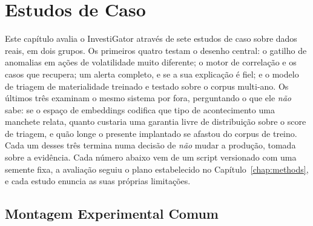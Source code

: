 
\chapter{Estudos de Caso}
\label{chap:casestudies}

Este capítulo avalia o InvestiGator através de sete estudos de caso sobre dados reais, em dois grupos. Os
primeiros quatro testam o desenho central: o gatilho de anomalias em ações de volatilidade muito
diferente; o motor de correlação e os casos que recupera; um alerta completo, e se a sua explicação
é fiel; e o modelo de triagem de materialidade treinado e testado sobre o corpus multi-ano. Os últimos
três examinam o mesmo sistema por fora, perguntando o que ele \emph{não} sabe: se o espaço de embeddings
codifica que tipo de acontecimento uma manchete relata, quanto custaria uma garantia livre de distribuição
sobre o score de triagem, e quão longe o presente implantado se afastou do corpus de treino. Cada um
desses três termina numa decisão de \emph{não} mudar a produção, tomada sobre a evidência. Cada número abaixo vem de um script versionado com uma semente
fixa, a avaliação seguiu o plano estabelecido no Capítulo~\ref{chap:methods}, e cada estudo enuncia as
suas próprias limitações.

\section{Montagem Experimental Comum}
\label{sec:cs_setup}

